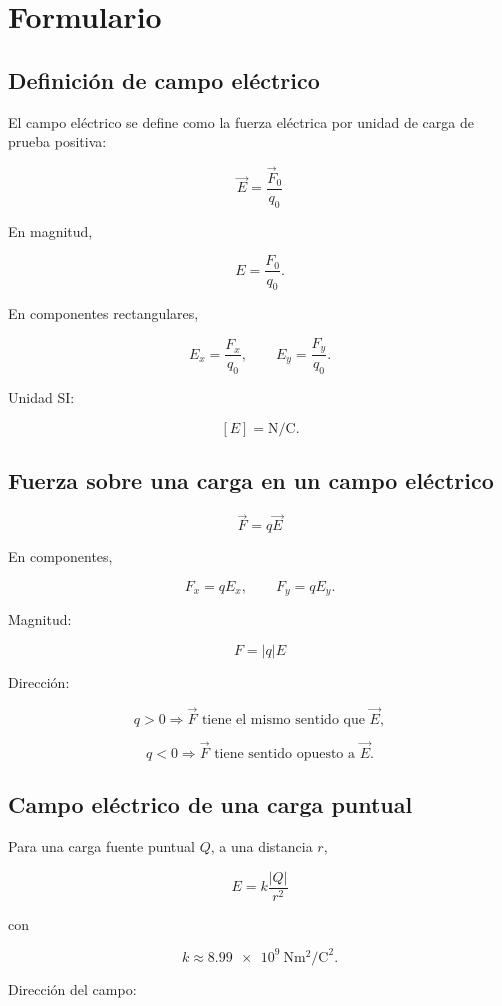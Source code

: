 \section{Formulario}

\subsection{Definición de campo eléctrico}

El campo eléctrico se define como la fuerza eléctrica por unidad de carga de prueba positiva:

\[
\boxed{\vec E=\frac{\vec F_0}{q_0}}
\]

En magnitud,

\[
\boxed{E=\frac{F_0}{q_0}}.
\]

En componentes rectangulares,

\[
\boxed{E_x=\frac{F_x}{q_0}}, \qquad
\boxed{E_y=\frac{F_y}{q_0}}.
\]

Unidad SI:

\[
\boxed{[E]=\si{\newton\per\coulomb}}.
\]


\subsection{Fuerza sobre una carga en un campo eléctrico}

\[
\boxed{\vec F=q\vec E}
\]

En componentes,

\[
\boxed{F_x=qE_x}, \qquad
\boxed{F_y=qE_y}.
\]

Magnitud:

\[
\boxed{F=|q|E}
\]

Dirección:

\[
q>0 \Longrightarrow \vec F \text{ tiene el mismo sentido que }\vec E,
\]

\[
q<0 \Longrightarrow \vec F \text{ tiene sentido opuesto a }\vec E.
\]


\subsection{Campo eléctrico de una carga puntual}

Para una carga fuente puntual \(Q\), a una distancia \(r\),

\[
\boxed{E=k\frac{|Q|}{r^2}}
\]

con

\[
\boxed{k\approx\SI{8.99e9}{\newton\metre\squared\per\coulomb\squared}}.
\]

Dirección del campo:

